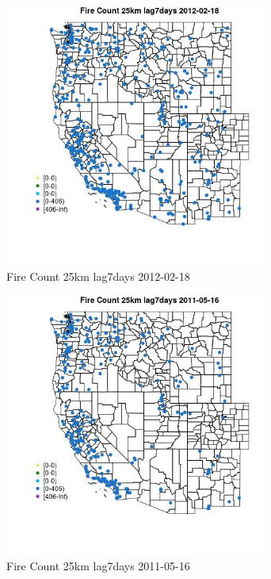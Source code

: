 \begin{figure} 
\centering  
\includegraphics[width=0.77\textwidth]{Code_Outputs/Report_ML_input_PM25_Step4_part_f_de_duplicated_aveswNAs_MapObsFire_Count_25km_lag7days2012-02-18.jpg} 
\caption{\label{fig:Report_ML_input_PM25_Step4_part_f_de_duplicated_aveswNAsMapObsFire_Count_25km_lag7days2012-02-18}Fire Count 25km lag7days 2012-02-18} 
\end{figure} 
 

\begin{figure} 
\centering  
\includegraphics[width=0.77\textwidth]{Code_Outputs/Report_ML_input_PM25_Step4_part_f_de_duplicated_aveswNAs_MapObsFire_Count_25km_lag7days2011-05-16.jpg} 
\caption{\label{fig:Report_ML_input_PM25_Step4_part_f_de_duplicated_aveswNAsMapObsFire_Count_25km_lag7days2011-05-16}Fire Count 25km lag7days 2011-05-16} 
\end{figure} 
 


